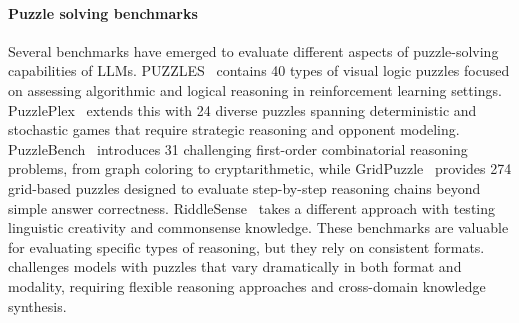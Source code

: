 \paragraph{Puzzle solving benchmarks}
Several benchmarks have emerged to evaluate different aspects of puzzle-solving capabilities of LLMs. 
PUZZLES~\citep{estermann2024puzzlesbenchmarkneuralalgorithmic} contains 40 types of visual logic puzzles focused on assessing algorithmic and logical reasoning in reinforcement learning settings.
PuzzlePlex~\citep{anonymous2025puzzleplex} extends this with 24 diverse puzzles spanning deterministic and stochastic games that require strategic reasoning and opponent modeling.
PuzzleBench~\citep{mittal2024puzzlebench} introduces 31 challenging first-order combinatorial reasoning problems, from graph coloring to cryptarithmetic, while GridPuzzle~\citep{tyagi2024step} provides 274 grid-based puzzles designed to evaluate step-by-step reasoning chains beyond simple answer correctness. 
RiddleSense~\citep{RiddleSense} takes a different approach with 
testing linguistic creativity and commonsense knowledge. 
These benchmarks are valuable for evaluating specific types of reasoning, but they rely on consistent formats.
\enigmaeval challenges models with puzzles that vary dramatically in both format and modality, requiring flexible reasoning approaches and cross-domain knowledge synthesis.





